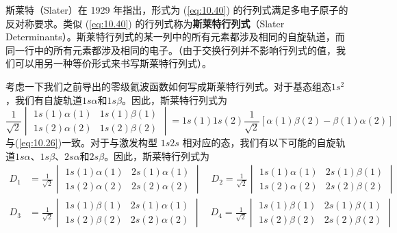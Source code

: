     斯莱特（Slater）在 1929 年指出，形式为 (\ref{eq:10.40}) 的行列式满足多电子原子的反对称要求。类似 (\ref{eq:10.40}) 的行列式称为\textbf{斯莱特行列式}（Slater Determinants）。斯莱特行列式的某一列中的所有元素都涉及相同的自旋轨道，而同一行中的所有元素都涉及相同的电子。（由于交换行列并不影响行列式的值，我们可以用另一种等价形式来书写斯莱特行列式）。

    考虑一下我们之前导出的零级氦波函数如何写成斯莱特行列式。对于基态组态$1s^2$，我们有自旋轨道$1s\alpha$和$1s\beta$。因此，斯莱特行列式为
    \begin{equation}
        \frac{1}{\sqrt{2}}\begin{vmatrix}
            1s\left(1\right)\alpha\left(1\right) & 1s\left(1\right)\beta\left(1\right) \\
            1s\left(2\right)\alpha\left(2\right) & 1s\left(2\right)\beta\left(2\right)
        \end{vmatrix} = 1s\left(1\right)1s\left(2\right) \frac{1}{\sqrt{2}}\left[\alpha\left(1\right)\beta\left(2\right) - \beta\left(1\right)\alpha\left(2\right)\right]
        \label{eq:10.41}
    \end{equation}
    与(\ref{eq:10.26})一致。对于与激发构型 $1s2s$ 相对应的态，我们有以下可能的自旋轨道$1s\alpha$、$1s\beta$、$2s\alpha$和$2s\beta$。因此，斯莱特行列式为
    \begin{equation*}
        \begin{aligned}
            D_1 &= \frac{1}{\sqrt{2}}\begin{vmatrix}
                1s\left(1\right)\alpha\left(1\right) & 2s\left(1\right)\alpha\left(1\right) \\
                1s\left(2\right)\alpha\left(2\right) & 2s\left(2\right)\alpha\left(2\right)
            \end{vmatrix}  \quad D_2 = \frac{1}{\sqrt{2}}\begin{vmatrix}
                1s\left(1\right)\alpha\left(1\right) & 2s\left(1\right)\beta\left(1\right) \\
                1s\left(2\right)\alpha\left(2\right) & 2s\left(2\right)\beta\left(2\right)
            \end{vmatrix} \\
            D_3 &= \frac{1}{\sqrt{2}}\begin{vmatrix}
                1s\left(1\right)\beta\left(1\right) & 2s\left(1\right)\alpha\left(1\right) \\
                1s\left(2\right)\beta\left(2\right) & 2s\left(2\right)\alpha\left(2\right)
            \end{vmatrix} \quad D_4 = \frac{1}{\sqrt{2}}\begin{vmatrix}
                1s\left(1\right)\beta\left(1\right) & 2s\left(1\right)\beta\left(1\right) \\
                1s\left(2\right)\beta\left(2\right) & 2s\left(2\right)\beta\left(2\right)
            \end{vmatrix}
        \end{aligned}
    \end{equation*}
